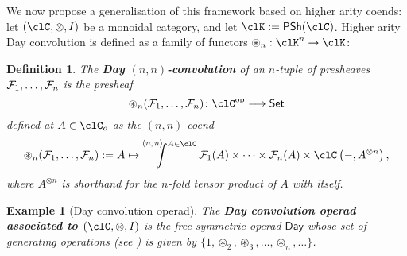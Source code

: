 \documentclass[11pt]{amsart}
\def\defeq{:=}
\newcommand*{\Scale}[2][4]{\scalebox{#1}{\ensuremath{#2}}}%
\newcommand{\PSh}[1]{\textsf{\upshape PSh}(#1)}
\newcommand{\otimesDayN}[1]{\mathbin{\circledast}_{#1}}
\newcommand{\pqCoend}[3]{%
  \mathchoice
    {\mathop{\prescript{\Scale[.75]{\raisebox{-.25em}{$(#1,#2)$}}\kern-.625em}{}{\int^{#3}}}}
    {\mathop{\prescript{\Scale[.75]{\raisebox{-.25em}{$(#1,#2)$}}\kern-.25em}{}{\int^{#3}}}}
    {\mathop{\prescript{\Scale[.75]{\raisebox{-.25em}{$(#1,#2)$}}\kern-.25em}{}{\int^{#3}}}}
    {\mathop{\prescript{\Scale[.75]{\raisebox{-.25em}{$(#1,#2)$}}\kern-.25em}{}{\int^{#3}}}}
  }
\newtheorem{definition}{Definition}
\newtheorem{example}{Example}
\def\op{\text{op}}
\begin{document}
We now propose a generalisation of this framework based on higher arity coends: let $(\clC,\otimes,I)$ be a monoidal category, and let $\clK\defeq \PSh{\clC}$. Higher arity Day convolution is defined as a family of functors $\otimesDayN{n} : \clK^n\to \clK$:
\begin{definition}\label{nn_day_convolution}
	The \textbf{Day $(n,n)$-convolution} of an $n$-tuple of presheaves $\tpl{\mathcal{F}}$ is the presheaf
	\[\otimesDayN{n}(\tpl{\mathcal{F}})\colon\clC^{\op}\longrightarrow\textsf{Set}\]
	defined at $A\in\clC_o$ as the $(n,n)$-coend
	\[\otimesDayN{n}(\tpl{\mathcal{F}}) \defeq A \mapsto \pqCoend{n}{n}{A\in\clC}\mathcal{F}_{1}(A)\times\cdots\times\mathcal{F}_{n}(A)\times\clC\left(-,A^{\otimes n}\right),\]
	where $A^{\otimes n}$ is shorthand for the $n$-fold tensor product of $A$ with itself.
\end{definition}
\begin{example}[Day convolution operad]\label{the-day-higher-arity-convolution-operad}%
	The \textbf{Day convolution operad associated to $(\clC,\otimes,I)$} is the free symmetric operad $\mathsf{Day}$ whose set of generating operations (see \cite[Section 1.2.5]{fresse-operads}) is given by $\{1,\otimesDayN{2},\otimesDayN{3},\ldots,\otimesDayN{n},\ldots\}$.
\end{example}
\end{document}
